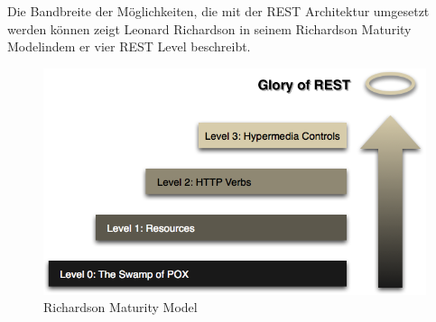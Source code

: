 		Die Bandbreite der Möglichkeiten, die mit der REST Architektur umgesetzt werden können zeigt Leonard Richardson in seinem \textacutedbl Richardson Maturity Model\textgravedbl indem er vier REST Level beschreibt.
	
		\begin{figure}[h]
			\centering
			\includegraphics[width=0.7\linewidth]{images/Richardson_Maturity_Model}
			\caption{Richardson Maturity Model}
			\label{fig:Richardson_Maturity_Model}
		\end{figure}
		
		\cite[vgl.][]{Fowler.2010}


